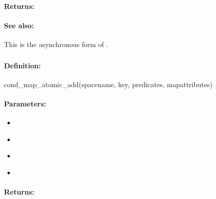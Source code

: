 \paragraph{Returns:}


\paragraph{See also:}  This is the asynchronous form of .

\pagebreak
\subsubsection{}
\label{api:ruby:cond_map_atomic_add}


\paragraph{Definition:}
\begin{rubycode}
cond_map_atomic_add(spacename, key, predicates, mapattributes)
\end{rubycode}

\paragraph{Parameters:}
\begin{itemize}[noitemsep]
\item {}\\

\item {}\\

\item {}\\

\item {}\\

\end{itemize}

\paragraph{Returns:}


